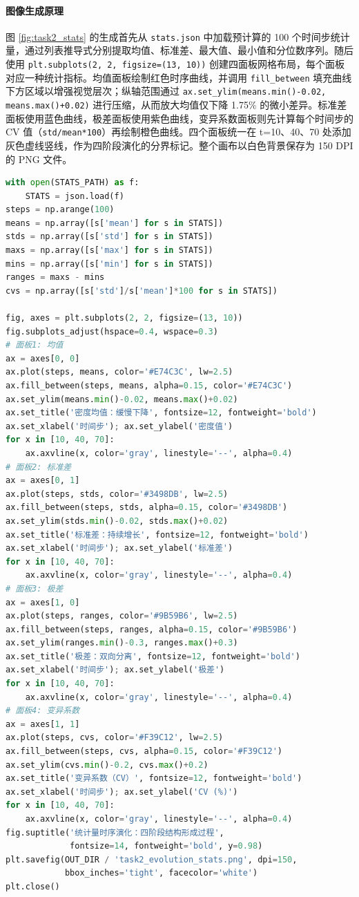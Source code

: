 \documentclass[12pt,a4paper]{article}
\begin{document}
\paragraph{图像生成原理}图 \ref{fig:task2_stats} 的生成首先从 \texttt{stats.json} 中加载预计算的 100 个时间步统计量，通过列表推导式分别提取均值、标准差、最大值、最小值和分位数序列。随后使用 \texttt{plt.subplots(2, 2, figsize=(13, 10))} 创建四面板网格布局，每个面板对应一种统计指标。均值面板绘制红色时序曲线，并调用 \texttt{fill\_between} 填充曲线下方区域以增强视觉层次；纵轴范围通过 \texttt{ax.set\_ylim(means.min()-0.02, means.max()+0.02)} 进行压缩，从而放大均值仅下降 1.75\% 的微小差异。标准差面板使用蓝色曲线，极差面板使用紫色曲线，变异系数面板则先计算每个时间步的 CV 值（\texttt{std/mean*100}）再绘制橙色曲线。四个面板统一在 t=10、40、70 处添加灰色虚线竖线，作为四阶段演化的分界标记。整个画布以白色背景保存为 150 DPI 的 PNG 文件。

\begin{lstlisting}[language=Python, caption=统计四面板图生成关键代码]
with open(STATS_PATH) as f:
    STATS = json.load(f)
steps = np.arange(100)
means = np.array([s['mean'] for s in STATS])
stds = np.array([s['std'] for s in STATS])
maxs = np.array([s['max'] for s in STATS])
mins = np.array([s['min'] for s in STATS])
ranges = maxs - mins
cvs = np.array([s['std']/s['mean']*100 for s in STATS])

fig, axes = plt.subplots(2, 2, figsize=(13, 10))
fig.subplots_adjust(hspace=0.4, wspace=0.3)
# 面板1: 均值
ax = axes[0, 0]
ax.plot(steps, means, color='#E74C3C', lw=2.5)
ax.fill_between(steps, means, alpha=0.15, color='#E74C3C')
ax.set_ylim(means.min()-0.02, means.max()+0.02)
ax.set_title('密度均值：缓慢下降', fontsize=12, fontweight='bold')
ax.set_xlabel('时间步'); ax.set_ylabel('密度值')
for x in [10, 40, 70]:
    ax.axvline(x, color='gray', linestyle='--', alpha=0.4)
# 面板2: 标准差
ax = axes[0, 1]
ax.plot(steps, stds, color='#3498DB', lw=2.5)
ax.fill_between(steps, stds, alpha=0.15, color='#3498DB')
ax.set_ylim(stds.min()-0.02, stds.max()+0.02)
ax.set_title('标准差：持续增长', fontsize=12, fontweight='bold')
ax.set_xlabel('时间步'); ax.set_ylabel('标准差')
for x in [10, 40, 70]:
    ax.axvline(x, color='gray', linestyle='--', alpha=0.4)
# 面板3: 极差
ax = axes[1, 0]
ax.plot(steps, ranges, color='#9B59B6', lw=2.5)
ax.fill_between(steps, ranges, alpha=0.15, color='#9B59B6')
ax.set_ylim(ranges.min()-0.3, ranges.max()+0.3)
ax.set_title('极差：双向分离', fontsize=12, fontweight='bold')
ax.set_xlabel('时间步'); ax.set_ylabel('极差')
for x in [10, 40, 70]:
    ax.axvline(x, color='gray', linestyle='--', alpha=0.4)
# 面板4: 变异系数
ax = axes[1, 1]
ax.plot(steps, cvs, color='#F39C12', lw=2.5)
ax.fill_between(steps, cvs, alpha=0.15, color='#F39C12')
ax.set_ylim(cvs.min()-0.2, cvs.max()+0.2)
ax.set_title('变异系数（CV）', fontsize=12, fontweight='bold')
ax.set_xlabel('时间步'); ax.set_ylabel('CV (%)')
for x in [10, 40, 70]:
    ax.axvline(x, color='gray', linestyle='--', alpha=0.4)
fig.suptitle('统计量时序演化：四阶段结构形成过程',
             fontsize=14, fontweight='bold', y=0.98)
plt.savefig(OUT_DIR / 'task2_evolution_stats.png', dpi=150,
            bbox_inches='tight', facecolor='white')
plt.close()
\end{lstlisting}
\end{document}
